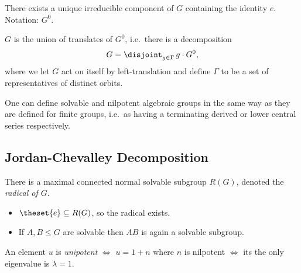 \begin{proposition}[?]

There exists a unique irreducible component of \(G\) containing the
identity \(e\). Notation: \(G^0\).

\end{proposition}

\begin{proposition}[?]

\(G\) is the union of translates of \(G^0\), i.e.~there is a
decomposition
\begin{align*}  
G = \disjoint_{g\in \Gamma} \, g\cdot G^0
,\end{align*} where we let \(G\) act on itself by left-translation and
define \(\Gamma\) to be a set of representatives of distinct orbits.

\end{proposition}

\begin{proposition}[?]

One can define solvable and nilpotent algebraic groups in the same way
as they are defined for finite groups, i.e.~as having a terminating
derived or lower central series respectively.

\end{proposition}

\hypertarget{jordan-chevalley-decomposition}{%
\subsection{Jordan-Chevalley
Decomposition}\label{jordan-chevalley-decomposition}}

\begin{proposition}

There is a maximal connected normal solvable subgroup \(R(G)\), denoted
the \emph{radical of \(G\)}.

\begin{itemize}
\tightlist
\item
  \(\theset{e} \subseteq R(G)\), so the radical exists.
\item
  If \(A, B \leq G\) are solvable then \(AB\) is again a solvable
  subgroup.
\end{itemize}

\end{proposition}

\begin{definition}[Unipotent]

An element \(u\) is \emph{unipotent} \(\iff\) \(u = 1+n\) where \(n\) is
nilpotent \(\iff\) its the only eigenvalue is \(\lambda = 1\).

\end{definition}

